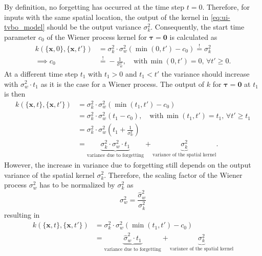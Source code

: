 By definition, no forgetting has occurred at the time step $t=0$. Therefore, for inputs with the same spatial location, the output of the kernel in \eqref{eq:ui-tvbo_model} should be the output variance $\sigma_k^2$. Consequently, the start time parameter $c_0$ of the Wiener process kernel for $\boldsymbol\tau = \mathbf{0}$ is calculated as 
\begin{align}
    k(\{\mathbf{x},0\},\{\mathbf{x},t'\}) &= \sigma_k^2\cdot \sigma_w^2 \left(\min(0,t') - c_0\right) \overset{!}{=} \sigma_k^2 \label{eq:c0}\\
    \implies c_0 &\overset{!}{=} - \frac{1}{\sigma_w^2} , \quad \text{with}\, \min(0,t') = 0, \, \forall t' \geq 0.
\end{align}
At a different time step $t_1$ with $t_1>0$ and $t_1<t'$ the variance should increase with $\sigma_w^2 \cdot t_1$ as it is the case for a Wiener process. The output of $k$ for $\boldsymbol\tau = \mathbf{0}$ at $t_1$ is then
\begin{align}
    k(\{\mathbf{x},t\},\{\mathbf{x},t'\}) &=\sigma_k^2 \cdot \sigma_w^2 \left(\min(t_1,t') - c_0\right) \\
    &= \sigma_k^2 \cdot \sigma_w^2 \left(t_1 - c_0\right), \quad \text{with}\, \min(t_1,t') = t_1, \, \forall t' \geq t_1\\
    &= \sigma_k^2 \cdot \sigma_w^2 \left(t_1 +  \frac{1}{\sigma_w^2}\right)\\
    &= \underbrace{\sigma_k^2 \cdot \sigma_w^2 \cdot t_1}_{\text{variance due to forgetting}} + \underbrace{\sigma_k^2}_{\text{variance of the spatial kernel}}.
\end{align}
However, the increase in variance due to forgetting still depends on the output variance of the spatial kernel $\sigma_k^2$. Therefore, the scaling factor of the Wiener process $\sigma_w^2$ has to be normalized by $\sigma_k^2$ as
\begin{equation}
    \sigma_w^2 = \frac{\hat{\sigma}_w^2}{\sigma_k^2}
\end{equation}
resulting in
\begin{align}
    k(\{\mathbf{x},t\},\{\mathbf{x},t'\}) &=\sigma_k^2 \cdot \sigma_w^2 \left(\min(t_1,t') - c_0\right)\\
    &= \underbrace{\hat{\sigma}_w^2 \cdot t_1}_{\text{variance due to forgetting}} + \underbrace{\sigma_k^2}_{\text{variance of the spatial kernel}} \label{eq:sigma_w_hat}
\end{align}
